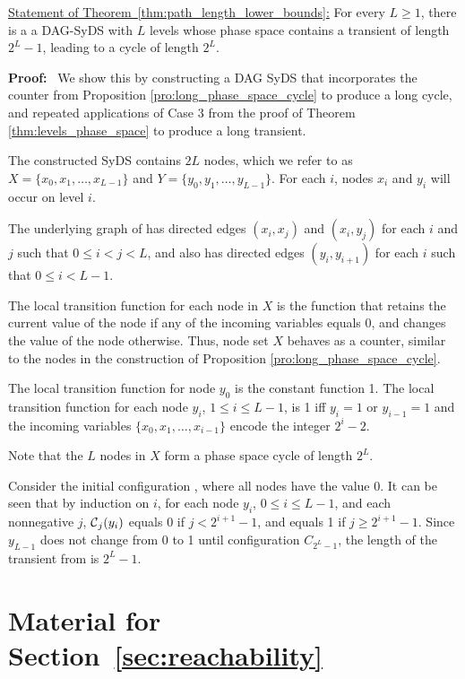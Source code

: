 \medskip

\noindent
\underline{Statement of Theorem~\ref{thm:path_length_lower_bounds}:}
For every $L  \geq 1$,
there is a a DAG-SyDS with $L$ levels
whose phase space contains a transient of length $2^L-1$,
leading to a cycle of length $2^L$.

\medskip

\noindent
\textbf{Proof:}~ 
We show this by constructing a DAG SyDS that
incorporates the counter from Proposition \ref{pro:long_phase_space_cycle}
to produce a long cycle, and repeated applications of Case 3 from
the proof of Theorem \ref{thm:levels_phase_space} to produce a long
transient.

The constructed SyDS \cals{}  contains
$2L$ nodes, which we refer to as $X = \{x_0, x_1, \dots , x_{L-1}\}$ 
and $Y = \{y_0, y_1, \dots , y_{L-1}\}$.
For each $i$, nodes $x_i$ and $y_i$ will occur on level $i$.

The underlying graph of \cals{} has directed edges
$(x_i, x_j)$  and $(x_i, y_j)$ for each $i$ and $j$  such that $0 \leq i < j  < L$,
and also has directed edges $(y_i, y_{i+1})$ for each $i$ such that $0 \leq i < L-1$.

The local transition function for each node in $X$ is the function 
that retains the current value of the node if any of the incoming variables equals 0,
and changes the value of the node otherwise.
Thus, node set $X$ behaves as a counter,
similar to the nodes in the construction of 
Proposition \ref{pro:long_phase_space_cycle}.

The local transition function for node $y_0$ is the constant function
1.  The local transition function for each node $y_i$, $1 \leq i
\leq L-1$, is 1 iff $y_i = 1$ or $y_{i-1} = 1$ and the incoming
variables $\{x_0, x_1, \dots , x_{i-1}\}$ encode the integer $2^i-2$.

Note that the $L$ nodes in $X$ form a phase space cycle of length $2^L$.

Consider the initial configuration \calc{}, where all nodes have the value 0.
It can be seen that by induction on $i$, for each node $y_i$, $0 \leq i \leq L-1$,
and each nonnegative $j$, 
$\mbox{$\mathcal{C}$}_j(y_i)$ equals 0 if $j < 2^{i+1} -1$, and equals 1 if $j \geq 2^{i+1} -1$.
Since $y_{L-1}$ does not change from 0 to 1 until configuration $C_{2^L-1}$, 
the length of the transient from \calc{} is $2^L-1$.
\QED

\bigskip


\section{Material for Section~\ref{sec:reachability}}
\label{asec:reach}

